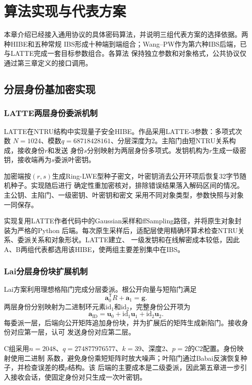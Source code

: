\chapter{算法实现与代表方案}

本章介绍已经接入通用协议的具体密码算法，并说明三组代表方案的选择依据。两种HIBE和五种常规
IBS形成十种端到端组合；Wang--PW作为第六种IBS后端，已与LATTE完成一套目标参数组合。各算法
保持独立参数和对象格式，公共协议仅通过第三章定义的接口调用。

\section{分层身份基加密实现}

\subsection{LATTE两层身份委派机制}

LATTE在NTRU结构中实现量子安全HIBE\cite{zhao2024latte}。作品采用LATTE-3参数：多项式次数
$N=1024$、模数$q=68718428161$、分层深度为2。主陷门由短NTRU关系构成，接收身份$r$和发送
身份$s$分别映射为两层身份多项式。发钥机构为$r$生成一级密钥，接收端再为$s$委派叶密钥。

加密端按$(r,s)$生成Ring-LWE型种子密文，叶密钥消去公开环项后恢复32字节随机种子。实现随后进行
确定性重加密核对，排除错误结果落入解码区间的情况。主公钥、主陷门、一级密钥、叶密钥和密文
采用不同对象类型，参数快照与对象一同保存。

实现复用LATTE作者代码中的Gaussian采样和ffSampling路径，并将原生对象封装为严格的Python
后端。每次原生采样后，适配层使用精确环算术检查NTRU关系、委派关系和对象形状。LATTE建立、
一级发钥和在线解密成本较低，因此A、B两组代表都选用该HIBE，使两组主要差别集中在IBS。

\subsection{Lai分层身份块扩展机制}

Lai方案利用理想格陷门完成分层委派\cite{lai2015trapdoors}。根公开向量与短陷门满足
\[
 \mathbf a_0^{\mathsf T}R+\mathbf a_1=\mathbf g.
\]
两层身份分别映射为二进制环元素$\mathrm{id}_1$和$\mathrm{id}_2$，完整身份公开项为
\[
 \mathbf a_{\mathrm{ID}}
 =\mathbf u_0+\mathrm{id}_1\mathbf u_1+\mathrm{id}_2\mathbf u_2.
\]
每委派一层，后端向公开矩阵追加身份块，并为扩展后的矩阵生成新陷门。接收身份对应第一层，认可
发送身份对应第二层。

C组采用$n=2048$、$q=274877976577$、$k=39$、深度2、$p=2$的C2配置。身份映射使用二进制
系数，避免身份乘短矩阵时放大噪声；叶陷门通过Babai反演恢复种子，并检查误差的模$p$结构。该
后端的主要成本是二级委派，因此第五章进一步引入接收会话，使固定身份对只生成一次叶密钥。

